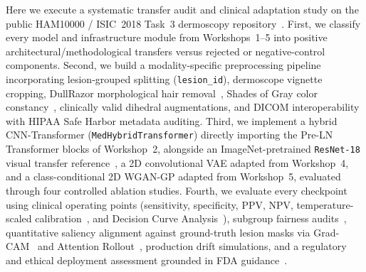 Here we execute a systematic transfer audit and clinical adaptation study on the public HAM10000 / ISIC~2018 Task~3 dermoscopy repository~\cite{Tschandl2018dataset,Codella2019skin}. First, we classify every model and infrastructure module from Workshops~1--5 into positive architectural/methodological transfers versus rejected or negative-control components. Second, we build a modality-specific preprocessing pipeline incorporating lesion-grouped splitting (\texttt{lesion\_id}), dermoscope vignette cropping, DullRazor morphological hair removal~\cite{Lee1997dullrazor}, Shades of Gray color constancy~\cite{Finlayson2004shades}, clinically valid dihedral augmentations, and DICOM interoperability with HIPAA Safe Harbor metadata auditing. Third, we implement a hybrid CNN-Transformer (\texttt{MedHybridTransformer}) directly importing the Pre-LN Transformer blocks of Workshop~2, alongside an ImageNet-pretrained \texttt{ResNet-18} visual transfer reference~\cite{He2016deep}, a 2D convolutional VAE adapted from Workshop~4, and a class-conditional 2D WGAN-GP adapted from Workshop~5, evaluated through four controlled ablation studies. Fourth, we evaluate every checkpoint using clinical operating points (sensitivity, specificity, PPV, NPV, temperature-scaled calibration~\cite{Guo2017calibration}, and Decision Curve Analysis~\cite{Vickers2006decision}), subgroup fairness audits~\cite{OakdenRayner2020hidden,Daneshjou2022disparities}, quantitative saliency alignment against ground-truth lesion masks via Grad-CAM~\cite{Selvaraju2017grad} and Attention Rollout~\cite{Abnar2020quantifying}, production drift simulations, and a regulatory and ethical deployment assessment grounded in FDA guidance~\cite{Food2021artificial,Gerke2020need}.
